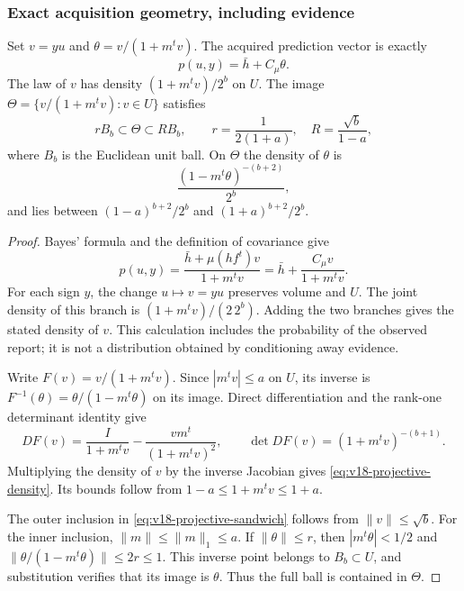 \subsubsection{Exact acquisition geometry, including evidence}
\begin{lemma}\label{lem:v18-projective-law}
Set $v=yu$ and $\theta=v/(1+m^tv)$. The acquired prediction vector is
exactly
\begin{equation}\label{eq:v18-projective-prediction}
 p(u,y)=\bar h+C_\mu\theta.
\end{equation}
The law of $v$ has density $(1+m^tv)/2^b$ on $U$. The image
$\Theta=\{v/(1+m^tv):v\in U\}$ satisfies
\begin{equation}\label{eq:v18-projective-sandwich}
 rB_b\subset\Theta\subset RB_b,
 \qquad r=\frac1{2(1+a)},\quad R=\frac{\sqrt b}{1-a},
\end{equation}
where $B_b$ is the Euclidean unit ball. On $\Theta$ the density of
$\theta$ is
\begin{equation}\label{eq:v18-projective-density}
 \frac{(1-m^t\theta)^{-(b+2)}}{2^b},
\end{equation}
and lies between $(1-a)^{b+2}/2^b$ and $(1+a)^{b+2}/2^b$.
\end{lemma}
\begin{proof}
Bayes' formula and the definition of covariance give
\[
 p(u,y)=\frac{\bar h+\mu(hf^t)v}{1+m^tv}
       =\bar h+\frac{C_\mu v}{1+m^tv}.
\]
For each sign $y$, the change $u\mapsto v=yu$ preserves volume and
$U$. The joint density of this branch is
$(1+m^tv)/(2\,2^b)$. Adding the two branches gives the stated density
of $v$. This calculation includes the probability of the observed
report; it is not a distribution obtained by conditioning away evidence.

Write $F(v)=v/(1+m^tv)$. Since $|m^tv|\le a$ on $U$, its inverse is
$F^{-1}(\theta)=\theta/(1-m^t\theta)$ on its image. Direct
differentiation and the rank-one determinant identity give
\[
 DF(v)=\frac{I}{1+m^tv}-\frac{vm^t}{(1+m^tv)^2},\qquad
 \det DF(v)=(1+m^tv)^{-(b+1)}.
\]
Multiplying the density of $v$ by the inverse Jacobian gives
\eqref{eq:v18-projective-density}. Its bounds follow from
$1-a\le1+m^tv\le1+a$.

The outer inclusion in \eqref{eq:v18-projective-sandwich} follows from
$\|v\|\le\sqrt b$. For the inner inclusion, $\|m\|\le\|m\|_1\le a$.
If $\|\theta\|\le r$, then $|m^t\theta|<1/2$ and
$\|\theta/(1-m^t\theta)\|\le2r\le1$. This inverse point belongs
to $B_b\subset U$, and substitution verifies that its image is
$\theta$. Thus the full ball is contained in $\Theta$.
\end{proof}


